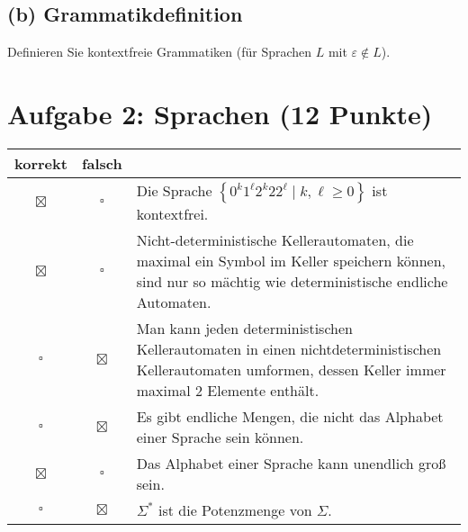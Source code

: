 \documentclass{scrartcl}
\begin{document}
\subsection*{(b) Grammatikdefinition \hfill{} } 
Definieren Sie kontextfreie Grammatiken (für Sprachen $L$ mit
\vspace{\baselineskip}
$\varepsilon\not\in L$).

\begin{center}
   \noindent{}
\end{center}

\section*{Aufgabe 2: Sprachen \hfill{} (12 Punkte)}

\newcommand{\mpsol}{\setlength{\fboxsep}{3pt}\colorbox{lightgray!20}{$\boxtimes$}}
\renewcommand{\mp}{\setlength{\fboxsep}{3pt}\colorbox{lightgray!20}{$\square$}}

{\renewcommand{\arraystretch}{1.4}
   \begin{tabularx}{\textwidth}{ccX}
      korrekt & falsch & \\ \hline
      \mpsol & \mp & Die Sprache $\left\{0^k1^\ell2^k22^\ell \mid k,\ell\ge 0\right\}$ ist kontextfrei.\\
      \mpsol & \mp & Nicht-deterministische Kellerautomaten, die maximal ein Symbol im Keller
      speichern können, sind nur so mächtig wie deterministische
      endliche Automaten. \\
      \mp & \mpsol & Man kann jeden deterministischen Kellerautomaten in einen
      nichtdeterministischen Kellerautomaten umformen, dessen Keller immer maximal 2
      Elemente enthält.\\
      \mp & \mpsol & Es gibt endliche Mengen, die nicht das Alphabet einer Sprache
      sein können. \\
      \mpsol & \mp & Das Alphabet einer Sprache kann unendlich groß sein.\\
      \mp & \mpsol & $\Sigma^*$ ist die Potenzmenge von $\Sigma$.
\end{tabularx}}
\end{document}
